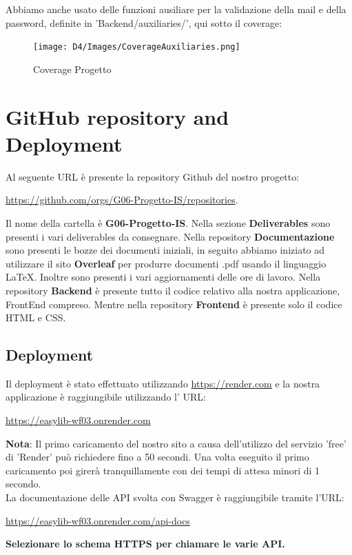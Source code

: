 \documentclass{article}
\begin{document}
Abbiamo anche usato delle funzioni ausiliare per la validazione della mail e della password, definite in 'Backend/auxiliaries/', qui sotto il coverage:

\begin{figure}[H]
    \centering
    \texttt{[image: D4/Images/CoverageAuxiliaries.png]}
    \caption{Coverage Progetto}
\end{figure}

\newpage

\section{GitHub repository and Deployment}
Al seguente URL è presente la repository Github del nostro progetto:
\begin{center}
\url{https://github.com/orgs/G06-Progetto-IS/repositories}.\\
\end{center}

Il nome della cartella è \textbf{G06-Progetto-IS}. Nella sezione \textbf{Deliverables} sono presenti i vari deliverables da consegnare.
Nella repository \textbf{Documentazione} sono presenti le bozze dei documenti iniziali, in seguito abbiamo iniziato ad utilizzare il sito \textbf{Overleaf} per produrre documenti .pdf usando il linguaggio \LaTeX. Inoltre sono presenti i vari aggiornamenti delle ore di lavoro.
Nella repository \textbf{Backend} è presente tutto il codice relativo alla nostra applicazione, FrontEnd compreso.
Mentre nella repository \textbf{Frontend} è presente solo il codice HTML e CSS.

\subsection{Deployment}
Il deployment è stato effettuato utilizzando \url{https://render.com} e la nostra applicazione è raggiungibile utilizzando l' URL: 
\begin{center}
 \url{https://easylib-wf03.onrender.com}  
\end{center}

\noindent \textbf{Nota}: Il primo caricamento del nostro sito a causa dell'utilizzo del servizio 'free' di 'Render' può richiedere fino a 50 secondi. Una volta eseguito il primo caricamento poi girerà tranquillamente con dei tempi di attesa minori di 1 secondo.\\

La documentazione delle API svolta con Swagger è raggiungibile tramite l'URL: 
\begin{center}
  \url{https://easylib-wf03.onrender.com/api-docs}  
\end{center}
\textbf{Selezionare lo schema HTTPS per chiamare le varie API.}
\end{document}
